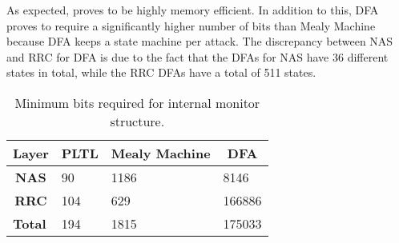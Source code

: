As expected,
\pltl proves to be highly memory efficient. In addition to this, DFA proves to require
a significantly higher number of bits than Mealy Machine because DFA keeps a state
machine per attack. The discrepancy between NAS and RRC for DFA is due to the fact that
the DFAs for NAS have 36 different states in total,
while the RRC DFAs have a total of 511 states.

\begin{table}[h!]
\centering

\begin{tabular}{c|l|l|l|}
\hline
\multicolumn{1}{|c|}{\textbf{Layer}} & \multicolumn{1}{c|}{\textbf{PLTL}} & \multicolumn{1}{c|}{\textbf{Mealy Machine}} & \multicolumn{1}{c|}{\textbf{DFA}} \\ \hline
\multicolumn{1}{|c|}{\textbf{NAS}} & 90 & 1186 & 8146 \\ \hline
\multicolumn{1}{|c|}{\textbf{RRC}} & 104 & 629 & 166886 \\ \hline
\multicolumn{1}{l|}{\textbf{Total}} & 194 & 1815 & 175033 \\ \cline{2-4}
\end{tabular}
\caption{Minimum bits required for internal monitor structure.}
\label{tab:memory_consumption_bits}
\end{table}
